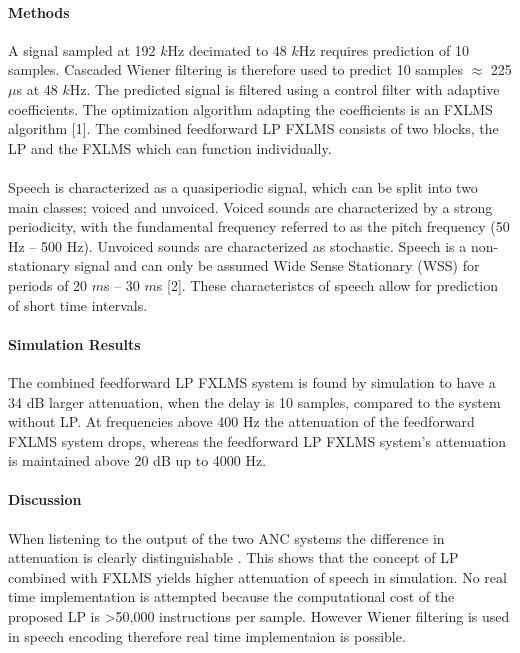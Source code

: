 \documentclass[a4paper]{article}
\begin{document}
	\paragraph{Methods}
	A signal sampled at 192 $k$Hz decimated to 48 $k$Hz requires prediction of 10 samples. Cascaded Wiener filtering is therefore used to predict 10 samples $\approx$ 225 $\mu$s at 48 $k$Hz. The predicted signal is filtered using a control filter with adaptive coefficients. The optimization algorithm adapting the coefficients is an FXLMS algorithm [1]. The combined feedforward LP FXLMS consists of two blocks, the LP and the FXLMS which can  function individually.
	\\\\
	Speech is characterized as a quasiperiodic signal, which can be split into two main classes; voiced and unvoiced. Voiced sounds are characterized by a strong periodicity, with the fundamental frequency referred to as the pitch frequency (50 Hz -- 500 Hz). Unvoiced sounds are characterized as stochastic. Speech is a non-stationary signal and can only be assumed Wide Sense Stationary (WSS) for periods of 20 $m$s -- 30 $m$s [2]. These characteristcs of speech allow for prediction of short time intervals.     




	\paragraph{Simulation Results}
	The combined feedforward LP FXLMS system is found by simulation to have a 34 dB larger attenuation, when the delay is 10 samples, compared to the system without LP. At frequencies above 400 Hz the attenuation of the feedforward FXLMS system drops, whereas the feedforward LP FXLMS system's attenuation is maintained above 20 dB up to 4000 Hz.

	\paragraph{Discussion}
	When listening to the output of the two ANC systems the difference in attenuation is clearly distinguishable . This shows that the concept of LP combined with FXLMS yields higher attenuation of speech in simulation. No real time implementation is attempted because the computational cost of the proposed LP is >50,000 instructions per sample. However Wiener filtering is used in speech encoding therefore real time implementaion is possible. 
	
\end{document}
